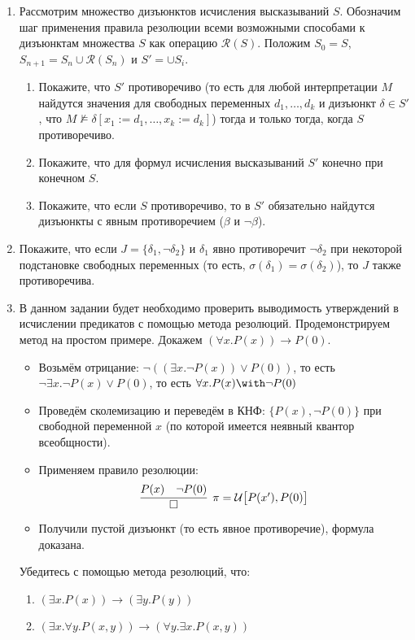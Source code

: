 \documentclass[10pt,a4paper,oneside]{article}
\begin{document}
\begin{enumerate}
\item Рассмотрим множество дизъюнктов исчисления высказываний $S$. 
Обозначим шаг применения правила резолюции всеми возможными способами к дизъюнктам 
множества $S$ как операцию $\mathcal{R}(S)$. Положим $S_0 = S$, $S_{n+1} = S_n \cup \mathcal{R}(S_n)$ и $S' = \cup S_i$.
\begin{enumerate}
\item Покажите, что $S'$ противоречиво (то есть для любой интерпретации $M$ найдутся значения для
свободных переменных $d_1,\dots,d_k$ и дизъюнкт $\delta \in S'$, что $M \not\models \delta[x_1 := d_1,\dots,x_k:=d_k]$)
тогда и только тогда, когда $S$ противоречиво.
\item Покажите, что для формул исчисления высказываний $S'$ конечно при конечном $S$.
\item Покажите, что если $S$ противоречиво, то в $S'$ обязательно найдутся дизъюнкты с явным противоречием ($\beta$ и $\neg\beta$).
\end{enumerate}
\item Покажите, что если $J = \{\delta_1,\neg\delta_2\}$ и $\delta_1$ явно противоречит $\neg\delta_2$ при некоторой подстановке
свободных переменных (то есть, $\sigma(\delta_1) = \sigma(\delta_2)$), то $J$ также противоречива.
\item В данном задании будет необходимо проверить выводимость утверждений в исчислении предикатов с помощью метода резолюций.
Продемонстрируем метод на простом примере. Докажем $(\forall x.P(x))\rightarrow P(0)$.
\begin{itemize}
\item Возьмём отрицание: $\neg((\exists x.\neg P(x)) \vee P(0))$, то есть $\neg \exists x.\neg P(x) \vee P(0)$,
то есть $\forall x.P(x) \with \neg P(0)$
\item Проведём сколемизацию и переведём в КНФ: $\{P(x),\neg P(0)\}$ при свободной переменной $x$ (по которой имеется
неявный квантор всеобщности).
\item Применяем правило резолюции:
$$\infer[\pi = \mathcal{U}\big[{P(x'),P(0)\big]}]{\Box}{P(x)\quad\neg P(0)}$$
\item Получили пустой дизъюнкт (то есть явное противоречие), формула доказана.
\end{itemize}
Убедитесь с помощью метода резолюций, что:
\begin{enumerate}
\item $(\exists x.P(x)) \rightarrow (\exists y.P(y))$
\item $(\exists x.\forall y.P(x,y)) \rightarrow (\forall y.\exists x.P(x,y))$

\end{enumerate}
\end{enumerate}
\end{document}
